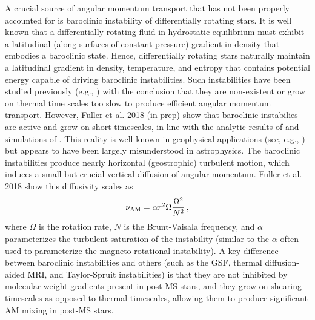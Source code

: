 A crucial source of angular momentum transport that has not been properly accounted for is baroclinic instability of differentially rotating stars. It is well known that a differentially rotating fluid in hydrostatic equilibrium must exhibit a latitudinal (along surfaces of constant pressure) gradient in density that embodies a baroclinic state. Hence, differentially rotating stars naturally maintain a latitudinal gradient in density, temperature, and entropy that contains potential energy capable of driving baroclinic instabilities. Such instabilities have been studied previously (e.g., \citealt{goldreich:67,knobloch:82,knobloch:83,spruit:84,zahn:93}) with the conclusion that they are non-existent or grow on thermal time scales too slow to produce efficient angular momentum transport. However, Fuller et al. 2018 (in prep) show that baroclinic instabilies are active and grow on short timescales, in line with the analytic results of \citep{tassoul:82,fujimoto:87,fujimoto:88} and simulations of \cite{simitev:17}. This reality is well-known in geophysical applications (see, e.g., \citealt{pedlosky:92}) but appears to have been largely misunderstood in astrophysics. The baroclinic instabilities produce nearly horizontal (geostrophic) turbulent motion, which induces a small but crucial vertical diffusion of angular momentum. Fuller et al. 2018 show this diffusivity scales as
\begin{equation}
\label{numri} 
\nu_{\rm AM} = \alpha r^2 \Omega \frac{\Omega^2}{N^2} \, ,
\end{equation}
where $\Omega$ is the rotation rate, $N$ is the Brunt-Vaisala frequency, and $\alpha$ parameterizes the turbulent saturation of the instability (similar to the $\alpha$ often used to parameterize the magneto-rotational instability). A key difference between baroclinic instabilities and others (such as the GSF, thermal diffusion-aided MRI, and Taylor-Spruit instabilities) is that they are not inhibited by molecular weight gradients present in post-MS stars, and they grow on shearing timescales as opposed to thermal timescales, allowing them to produce significant AM mixing in post-MS stars.




